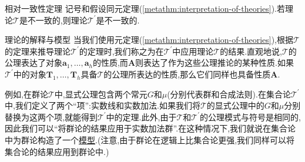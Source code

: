 \begin{corollary}{相对一致性定理}{}
	记号和假设同元定理(\ref{metathm:interpretation-of-theories}).若理论$\mathcal{T}$是不一致的,则理论$\mathcal{T}^{\prime}$是不一致的.
\end{corollary}

\begin{remark}{理论的解释与模型}{}
	当我们使用元定理(\ref{metathm:interpretation-of-theories}),根据$\mathcal{T}$的定理来推导理论$\mathcal{T}^{\prime}$的定理时,我们称之为在$\mathcal{T}^{\prime}$中应用理论$\mathcal{T}$的结果.直观地说,$\mathcal{T}$的公理表达了对象$\boldsymbol{a}_{1},\ldots,\boldsymbol{a}_{h}$的性质,而$\boldsymbol{A}$则表达了作为这些公理推论的某种性质.如果$\mathcal{T}^{\prime}$中的对象$\boldsymbol{T}_{1},\ldots,\boldsymbol{T}_{h}$具备$\mathcal{T}$的公理所表达的性质,那么它们同样也具备性质$\boldsymbol{A}$.
	
	例如,在群论$\mathcal{T}$中,显式公理包含两个常元$G$和$\mu$(分别代表群和合成法则).在集合论$\mathcal{T}^{\prime}$中,我们定义了两个``项'':实数线和实数加法.如果我们将$\mathcal{T}$的显式公理中的$G$和$\mu$分别替换为这两个项,就能得到$\mathcal{T}^{\prime}$中的定理.此外,由于$\mathcal{T}$和$\mathcal{T}^{\prime}$的公理模式与符号是相同的,因此我们可以``将群论的结果应用于实数加法群''.在这种情况下,我们就说在集合论中为群论构造了一个\underline{模型}.(注意,由于群论在逻辑上比集合论更强,我们同样可以将集合论的结果应用到群论中.)
\end{remark}